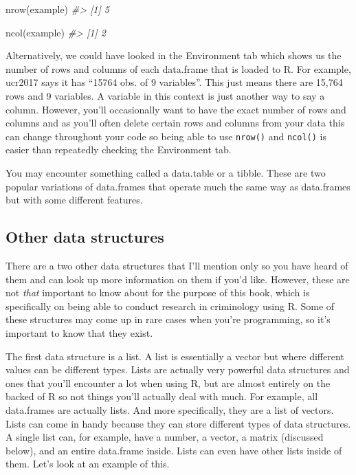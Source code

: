 \documentclass[
]{krantz}
\makeatletter
\newenvironment{Shaded}{\begin{snugshade}}{\end{snugshade}}
\newcommand{\CommentTok}[1]{\textcolor[rgb]{0.37,0.37,0.37}{\textit{#1}}}
\newcommand{\FunctionTok}[1]{\textcolor[rgb]{0,0,0}{#1}}
\newcommand{\NormalTok}[1]{#1}
\newenvironment{kframe}{%
\medskip{}
\setlength{\fboxsep}{.8em}
 \def\at@end@of@kframe{}%
 \ifinner\ifhmode%
  \def\at@end@of@kframe{\end{minipage}}%
  \begin{minipage}{\columnwidth}%
 \fi\fi%
 \def\FrameCommand##1{\hskip\@totalleftmargin \hskip-\fboxsep
 \colorbox{shadecolor}{##1}\hskip-\fboxsep
     \hskip-\linewidth \hskip-\@totalleftmargin \hskip\columnwidth}%
 \MakeFramed {\advance\hsize-\width
   \@totalleftmargin\z@ \linewidth\hsize
   \@setminipage}}%
 {\par\unskip\endMakeFramed%
 \at@end@of@kframe}
\renewenvironment{Shaded}{\begin{kframe}}{\end{kframe}}
\makeatother
\begin{document}
\begin{Shaded}
\begin{Highlighting}[]
\FunctionTok{nrow}\NormalTok{(example)}
\CommentTok{\#\textgreater{} [1] 5}
\end{Highlighting}
\end{Shaded}

\begin{Shaded}
\begin{Highlighting}[]
\FunctionTok{ncol}\NormalTok{(example)}
\CommentTok{\#\textgreater{} [1] 2}
\end{Highlighting}
\end{Shaded}

Alternatively, we could have looked in the Environment tab which shows us the number of rows and columns of each data.frame that is loaded to R. For example, ucr2017 says it has ``15764 obs. of 9 variables''. This just means there are 15,764 rows and 9 variables. A variable in this context is just another way to say a column. However, you'll occasionally want to have the exact number of rows and columns and as you'll often delete certain rows and columns from your data this can change throughout your code so being able to use \texttt{nrow()} and \texttt{ncol()} is easier than repeatedly checking the Environment tab.

You may encounter something called a data.table or a tibble. These are two popular variations of data.frames that operate much the same way as data.frames but with some different features.

\hypertarget{other-data-structures}{%
\subsection{Other data structures}\label{other-data-structures}}

There are a two other data structures that I'll mention only so you have heard of them and can look up more information on them if you'd like. However, these are not \emph{that} important to know about for the purpose of this book, which is specifically on being able to conduct research in criminology using R. Some of these structures may come up in rare cases when you're programming, so it's important to know that they exist.

The first data structure is a list. A list is essentially a vector but where different values can be different types. Lists are actually very powerful data structures and ones that you'll encounter a lot when using R, but are almost entirely on the backed of R so not things you'll actually deal with much. For example, all data.frames are actually lists. And more specifically, they are a list of vectors. Lists can come in handy because they can store different types of data structures. A single list can, for example, have a number, a vector, a matrix (discussed below), and an entire data.frame inside. Lists can even have other lists inside of them. Let's look at an example of this.
\end{document}
